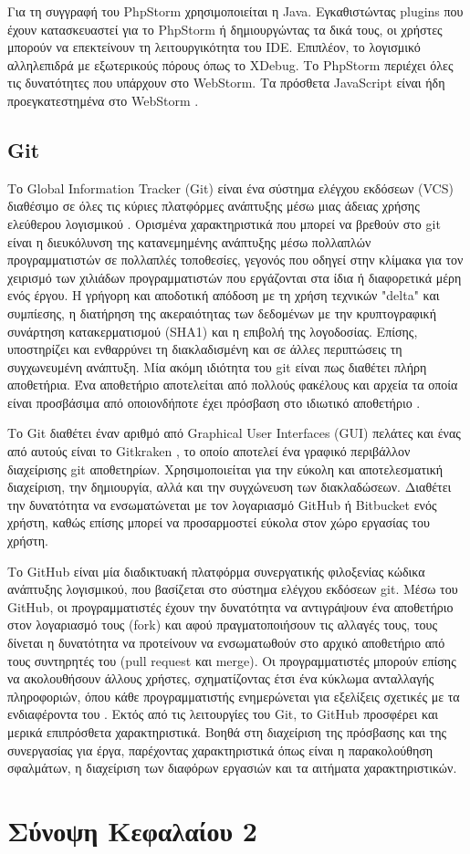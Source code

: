 Για τη συγγραφή του PhpStorm χρησιμοποιείται η Java. Εγκαθιστώντας plugins που έχουν κατασκευαστεί για το PhpStorm ή δημιουργώντας τα δικά τους, οι χρήστες μπορούν να επεκτείνουν τη λειτουργικότητα του IDE. Επιπλέον, το λογισμικό αλληλεπιδρά με εξωτερικούς πόρους όπως το XDebug. Το PhpStorm περιέχει όλες τις δυνατότητες που υπάρχουν στο WebStorm. Τα πρόσθετα JavaScript είναι ήδη προεγκατεστημένα στο WebStorm \cite{PhpStorm_JetBrains}.

\subsection{Git}
Το Global Information Tracker (Git) είναι ένα σύστημα ελέγχου εκδόσεων (VCS) διαθέσιμο σε όλες τις κύριες πλατφόρμες ανάπτυξης μέσω μιας άδειας χρήσης ελεύθερου λογισμικού \cite{spinellis2012git}. Ορισμένα χαρακτηριστικά που μπορεί να βρεθούν στο git είναι η διευκόλυνση της κατανεμημένης ανάπτυξης μέσω πολλαπλών προγραμματιστών σε πολλαπλές τοποθεσίες, γεγονός που οδηγεί στην κλίμακα για τον χειρισμό των χιλιάδων προγραμματιστών που εργάζονται στα ίδια ή διαφορετικά μέρη ενός έργου. Η γρήγορη και αποδοτική απόδοση με τη χρήση τεχνικών "delta" και συμπίεσης, η διατήρηση της ακεραιότητας των δεδομένων με την κρυπτογραφική συνάρτηση κατακερματισμού (SHA1) και η επιβολή της λογοδοσίας. Επίσης, υποστηρίζει και ενθαρρύνει τη διακλαδισμένη και σε άλλες περιπτώσεις τη συγχωνευμένη ανάπτυξη. Μία ακόμη ιδιότητα του git είναι πως διαθέτει πλήρη αποθετήρια. Ένα αποθετήριο αποτελείται από πολλούς φακέλους και αρχεία τα οποία είναι προσβάσιμα από οποιονδήποτε έχει πρόσβαση στο ιδιωτικό αποθετήριο \cite{loeliger2012version}. 

Το Git διαθέτει έναν αριθμό από Graphical User Interfaces (GUI) πελάτες και ένας από αυτούς είναι το Gitkraken \cite{gitkrakenwhatisit}, το οποίο αποτελεί ένα γραφικό περιβάλλον διαχείρισης git αποθετηρίων. Χρησιμοποιείται για την εύκολη και αποτελεσματική διαχείριση, την δημιουργία, αλλά και την συγχώνευση των διακλαδώσεων. Διαθέτει την δυνατότητα να ενσωματώνεται με τον λογαριασμό GitHub ή Bitbucket ενός χρήστη, καθώς επίσης μπορεί να προσαρμοστεί εύκολα στον χώρο εργασίας του χρήστη.

Το GitHub είναι μία διαδικτυακή πλατφόρμα συνεργατικής φιλοξενίας κώδικα ανάπτυξης λογισμικού, που βασίζεται στο σύστημα ελέγχου εκδόσεων git. Μέσω του GitHub, οι προγραμματιστές έχουν την δυνατότητα να αντιγράψουν ένα αποθετήριο στον λογαριασμό τους (fork) και αφού πραγματοποιήσουν τις αλλαγές τους, τους δίνεται η δυνατότητα να προτείνουν  να ενσωματωθούν στο αρχικό αποθετήριο από τους συντηρητές του (pull request και merge). Οι προγραμματιστές μπορούν επίσης να ακολουθήσουν άλλους χρήστες, σχηματίζοντας έτσι ένα κύκλωμα ανταλλαγής πληροφοριών, όπου κάθε προγραμματιστής ενημερώνεται για εξελίξεις σχετικές με τα ενδιαφέροντα του \cite{kalliamvakou2014promises}. Εκτός από τις λειτουργίες του Git, το GitHub προσφέρει και μερικά επιπρόσθετα χαρακτηριστικά. Βοηθά στη διαχείριση της πρόσβασης και της συνεργασίας για έργα, παρέχοντας χαρακτηριστικά όπως είναι η παρακολούθηση σφαλμάτων, η διαχείριση των διαφόρων εργασιών και τα αιτήματα χαρακτηριστικών.

\section{Σύνοψη Κεφαλαίου 2}

